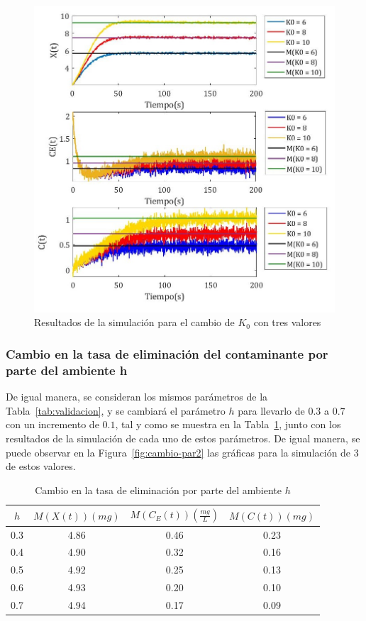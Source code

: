 \begin{figure}[ht!]
\centering
\includegraphics[scale = 0.37]{cambio1}
\caption{Resultados de la simulación para el cambio de $K_0$ con tres valores}
\label{fig:cambio-par1}
\end{figure}

\subsubsection{Cambio en la tasa de eliminación del contaminante por parte del ambiente h}
De igual manera, se consideran los mismos parámetros de la Tabla~\ref{tab:validacion}, y se cambiará el parámetro $h$ para llevarlo de $0.3$ a $0.7$ con un incremento de $0.1$, tal y como se muestra en la Tabla~\ref{tab:cambio-par2}, junto con los resultados de la simulación de cada uno de estos parámetros. De igual manera, se puede observar en la Figura~\ref{fig:cambio-par2} las gráficas para la simulación de 3 de estos valores.
\begin{table}[ht!]
\centering
\caption{Cambio en la tasa de eliminación por parte del ambiente $h$}
\label{tab:cambio-par2}
\begin{tabular}{|c|c|c|c|}
\hline
$h$ & $M(X(t))(mg)$ & $M(C_E(t))(\frac{mg}{L})$ & $M(C(t))(mg)$ \\\hline
0.3 & 4.86 & 0.46 & 0.23 \\\hline
0.4 & 4.90 & 0.32 & 0.16 \\\hline
0.5 & 4.92 & 0.25 & 0.13 \\\hline
0.6 & 4.93 & 0.20 & 0.10 \\\hline
0.7 & 4.94 & 0.17 & 0.09 \\\hline
\end{tabular}
\end{table}

